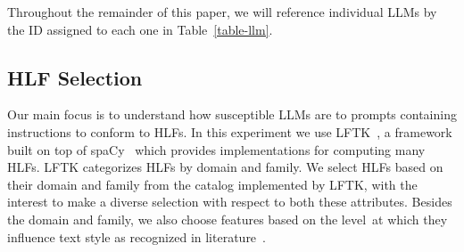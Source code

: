 \documentclass[a4paper,twoside]{article}
\begin{document}
\begin{table}[ht!]
    \setlength\tabcolsep{6pt}
    \centering
    \caption{Large Language Model Selection}\label{table-llm}
\end{table}

Throughout the remainder of this paper, we will reference individual LLMs by the
ID assigned to each one in Table~\ref{table-llm}.

\subsection{HLF Selection}\label{hlf-selection}

Our main focus is to understand how susceptible LLMs are to prompts containing
instructions to conform to HLFs.
In this experiment we use LFTK~\cite{lftk-2023}, a framework built on top of
spaCy~\cite{spacy} which provides implementations for computing many HLFs.
LFTK categorizes HLFs by domain and family.
We select HLFs based on their domain and family from the catalog implemented by
LFTK, with the interest to make a diverse selection with respect to both
these attributes.
Besides the domain and family, we also choose features based on the
level\footnotemark~at which they influence text style as recognized in
literature~\cite{verma2019lexical,lugea2023stylistics}.
\end{document}
